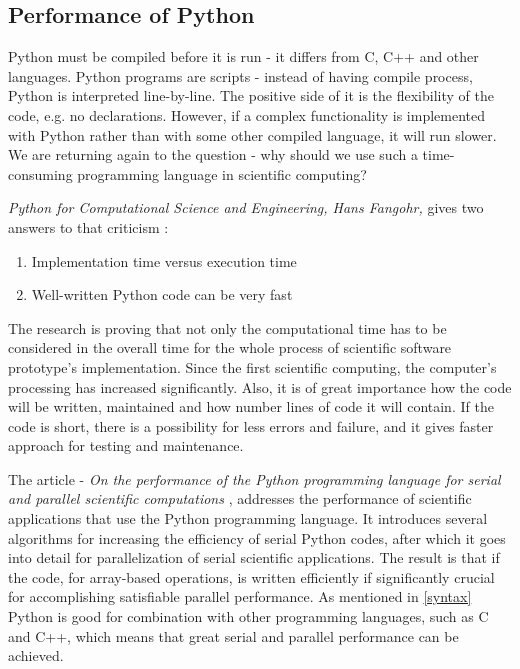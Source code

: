 \subsection{Performance of Python}
\label{performance}

Python must be compiled before it is run - it differs from C, C++ and other languages. Python programs are scripts - instead of having compile process, Python is interpreted line-by-line. The positive side of it is the flexibility of the code, e.g. no declarations. However, if a complex functionality is implemented with Python rather than with some other compiled language, it will run slower. We are returning again to the question - why should we use such a time-consuming programming language in scientific computing? \cite{ScottPython}

\textit{Python for Computational Science and Engineering, Hans Fangohr,} gives two answers to that criticism \cite{HansPython}:
\begin{enumerate}
\item Implementation time versus execution time
\item Well-written Python code can be very fast
\end{enumerate}

The research is proving that not only the computational time has to be considered in the overall time for the whole process of scientific software prototype's implementation. Since the first scientific computing, the computer's processing has increased significantly. Also, it is of great importance how the code will be written, maintained and how number lines of code it will contain. If the code is short, there is a possibility for less errors and failure, and it gives faster approach for testing and maintenance. 

The article - \textit{On the performance of the Python programming language for serial and parallel scientific computations} \cite{cai2005performance}, addresses the performance of scientific applications that use the Python programming language. It introduces several algorithms for increasing the efficiency of serial Python codes, after which it goes into detail for parallelization of serial scientific applications. The result is that if the code, for array-based operations, is written efficiently if significantly crucial for accomplishing satisfiable parallel performance. As mentioned in \ref{syntax} Python is good for combination with other programming languages, such as C and C++, which means that great serial and parallel performance can be achieved. 

